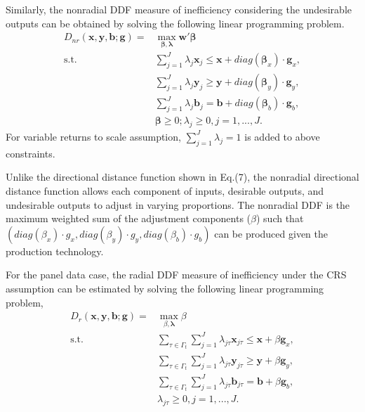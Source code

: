 Similarly, the nonradial DDF measure of inefficiency considering the undesirable outputs can be obtained by solving the following linear programming problem.
\begin{equation}\begin{split}\label{eq_eff_nr}
    D_{nr} (\pmb{x},\pmb{y},\pmb{b};\pmb{g}) 
    = &\max _{\pmb{\beta},\pmb{\lambda}} \pmb{w'} \pmb{\beta}  \\ 
    \text{s.t.} &\sum\limits_{j = 1}^J {\lambda _j \pmb{x}_j \le \pmb{x} + diag(\pmb{\beta}_x)\cdot \pmb{g}_x}, \\ 
                &\sum\limits_{j = 1}^J {\lambda _j \pmb{y}_j \ge \pmb{y} + diag(\pmb{\beta}_y)\cdot \pmb{g}_y}, \\ 
                &\sum\limits_{j = 1}^J {\lambda _j \pmb{b}_j = \pmb{b} + diag(\pmb{\beta}_b)\cdot \pmb{g}_b}, \\ 
                &\pmb{\beta} \ge 0; \lambda _j \ge 0, j = 1,...,J.
\end{split}\end{equation}
For variable returns to scale assumption, $\sum_{j=1}^{J} \lambda_j =1$ is added to above constraints. 

Unlike the directional distance function shown in Eq.(7), the nonradial directional distance function allows each component of inputs, desirable outputs, and undesirable outputs to adjust in varying proportions. The nonradial DDF is the maximum weighted sum of the adjustment components ($\beta$) such that $(diag(\beta_x)\cdot g_x,diag(\beta_y)\cdot g_y,diag(\beta_b)\cdot g_b)$ can be produced given the production technology. 


For the panel data case, the radial DDF measure of inefficiency under the CRS assumption can be estimated by solving the following linear programming problem,
\begin{equation}\begin{split}\label{eq_eff_r_panel}
    D_r (\pmb{x},\pmb{y},\pmb{b};\pmb{g}) 
    = &\max _{\beta,\pmb{\lambda}} \beta  \\ 
    \text{s.t.} &\sum\limits_{\tau \in \Gamma_t }\sum\limits_{j = 1}^J {{\lambda _{j\tau}}{{\pmb{x}}_{j\tau}} \le \pmb{x} + \beta \pmb{g}_x}, \\ 
                &\sum\limits_{\tau \in \Gamma_t }\sum\limits_{j = 1}^J {{\lambda _{j\tau}}{{\pmb{y}}_{j\tau}} \ge \pmb{y} + \beta \pmb{g}_y}, \\ 
                &\sum\limits_{\tau \in \Gamma_t }\sum\limits_{j = 1}^J {{\lambda _{j\tau}}{{\pmb{b}}_{j\tau}} = \pmb{b} + \beta \pmb{g}_b}, \\ 
                &\lambda _{j\tau} \ge 0, j = 1,...,J.
\end{split}\end{equation}

